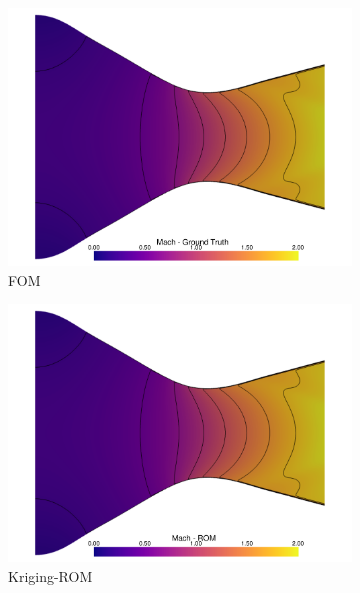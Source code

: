 \documentclass[tg, EN]{ufabcFHZh_tg}
\begin{document}
\begin{figure}[H]
    \centering
    \begin{subfigure}[b]{0.32\textwidth}
        \centering
        \includegraphics[width=\textwidth]{Figuras/kriging_ground_truth_mach.pdf}
        \caption{FOM}
    \end{subfigure}
    \hfill
    \begin{subfigure}[b]{0.32\textwidth}
        \centering
        \includegraphics[width=\textwidth]{Figuras/kriging_prediction_mach.pdf}
        \caption{Kriging-ROM}
    \end{subfigure}
    \hfill
    \begin{subfigure}[b]{0.32\textwidth}
        \centering

\end{subfigure}
\end{figure}
\end{document}
